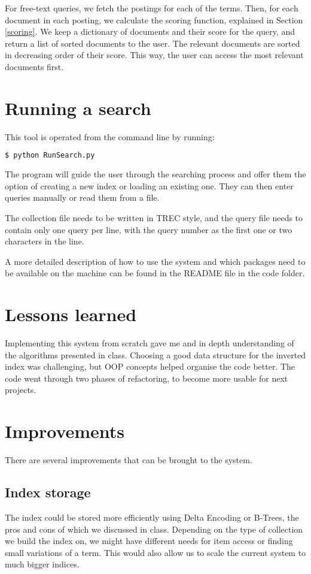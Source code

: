 \documentclass[11pt]{article}
\begin{document}
\begin{multicols}{2}
For free-text queries, we fetch the postings for each of the terms. Then, for each document in each posting, we calculate the scoring function, explained in Section \ref{scoring}. We keep a dictionary of documents and their score for the query, and return a list of sorted documents to the user. The relevant documents are sorted in decreasing order of their score. This way, the user can access the most relevant documents first.

\section{Running a search} \label{search}
This tool is operated from the command line by running:

\begin{lstlisting}[language=bash]
$ python RunSearch.py
\end{lstlisting}

The program will guide the user through the searching process and offer them the option of creating a new index or loading an existing one. They can then enter queries manually or read them from a file.

The collection file needs to be written in TREC style, and the query file needs to contain only one query per line, with the query number as the first one or two characters in the line.

A more detailed description of how to use the system and which packages need to be available on the machine can be found in the README file in the code folder.

\section{Lessons learned}
Implementing this system from scratch gave me and in depth understanding of the algorithms presented in class. Choosing a good data structure for the inverted index was challenging, but OOP concepts helped organise the code better. The code went through two phases of refactoring, to become more usable for next projects.

\section{Improvements} \label{improvements}
There are several improvements that can be brought to the system. 

\subsection{Index storage}
The index could be stored more efficiently using Delta Encoding or B-Trees, the pros and cons of which we discussed in class. Depending on the type of collection we build the index on, we might have different needs for item access or finding small variations of a term. This would also allow us to scale the current system to much bigger indices.


\end{multicols}
\end{document}
